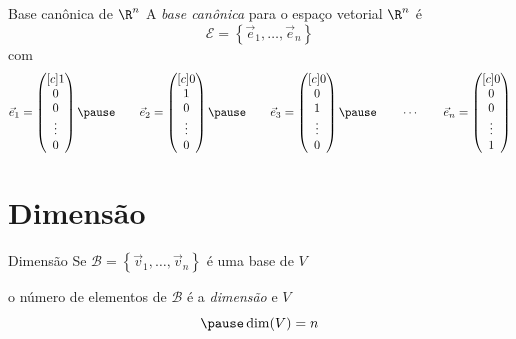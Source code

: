 \documentclass[fleqn,aspectratio=169,12pt]{beamer}
\begin{document}
\begin{frame}[t]{Base canônica de $\R^n$}
  A \emph{base canônica} para o espaço vetorial \(\R^n\)
  \pause
  é
  \[
    \mathcal{E} = \left\{ \vec{e}_{1}, \ldots, \vec{e}_{n} \right\}
  \]
  \pause
  com
  \[
    \vec{e}_1 =
    \begin{pmatrix}[c]
      1      \\
      0      \\
      0      \\
      \vdots \\
      0
    \end{pmatrix}
    \pause
    \qquad
    \vec{e}_2 =
    \begin{pmatrix}[c]
      0      \\
      1      \\
      0      \\
      \vdots \\
      0
    \end{pmatrix}
    \pause
    \qquad
    \vec{e}_3 =
    \begin{pmatrix}[c]
      0      \\
      0      \\
      1      \\
      \vdots \\
      0
    \end{pmatrix}
    \pause
    \qquad
    \cdots
    \qquad
    \vec{e}_n =
    \begin{pmatrix}[c]
      0      \\
      0      \\
      0      \\
      \vdots \\
      1
    \end{pmatrix}
  \]
\end{frame}



%


\section{Dimensão}

\begin{frame}{Dimensão}
  Se
  \(
    \mathcal{B} = \left\{ \vec{v}_{1}, \ldots, \vec{v}_{n} \right\}
  \)
  é uma base de $V$

  \pause o número de elementos de \(\mathcal{B}\)
  \pause é a \emph{dimensão} e $V$
  \[
    \pause
    \dim(V) = n
  \]
\end{frame}
\end{document}
